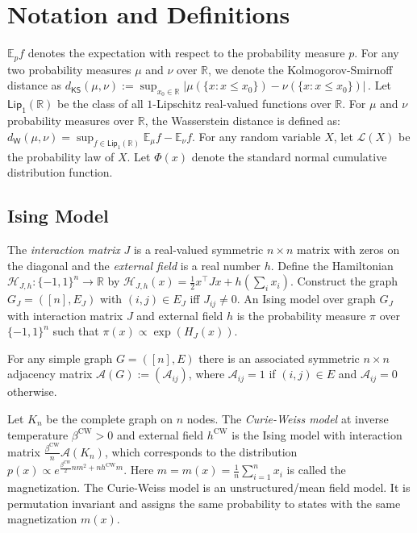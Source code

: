 \documentclass[final,12pt]{colt2018}
\begin{document}
\section{Notation and Definitions}\label{s:notation}
$\mathbb{E}_p f$ denotes the expectation with respect to the probability measure $p$. For any two probability measures $\mu$ and $\nu$ over $\mathbb{R}$, we denote the Kolmogorov-Smirnoff distance as $d_{\mathsf{KS}}(\mu,\nu) := \sup_{x_0 \in \mathbb{R}}|\mu(\{x:x \leq x_0\} ) - \nu(\{x: x \leq x_0\})|\,.$
Let $\mathsf{Lip}_1(\mathbb{R})$ be the class of all $1$-Lipschitz real-valued functions over $\mathbb{R}$. For $\mu$ and $\nu$ probability measures over $\mathbb{R}$, the Wasserstein distance is defined as:
$d_{\mathsf{W}}(\mu,\nu) = \sup_{f \in \mathsf{Lip}_1(\mathbb{R})} \mathbb{E}_{\mu}f -\mathbb{E}_{\nu}f$.
For any random variable $X$, let $\mathcal{L}(X)$ be the probability law of $X$. Let $\Phi(x)$ denote the standard normal cumulative distribution function.

\subsection{Ising Model}
The \emph{interaction matrix} $J$ is a real-valued symmetric $n \times n$ matrix with zeros on the diagonal and the \emph{external field} is a real number $h$. Define the Hamiltonian $\mathcal{H}_{J,h}: \{-1,1\}^n \to \mathbb{R}$ by $\mathcal{H}_{J,h}(x) = \frac{1}{2}x^{\intercal}Jx + h\left(\sum_i x_i\right)$. Construct the graph $G_J = ([n],E_J)$ with $(i,j) \in E_J$ iff $J_{ij} \neq 0$.  An Ising model over graph $G_J$ with interaction matrix $J$ and external field $h$ is the probability measure $\pi$ over $\{-1,1\}^n$ such that $\pi(x) \propto \exp{(H_J(x))}$. 


For any simple graph $G = ([n],E)$ there is an associated symmetric $n\times n$ adjacency matrix $\mathcal{A}(G) := (\mathcal{A}_{ij})$, where
$\mathcal{A}_{ij} = 
1$ if $(i,j) \in E$ and 
$\mathcal{A}_{ij} = 0$ otherwise.

 Let $K_n$ be the complete graph on $n$ nodes.
The \emph{Curie-Weiss model} at inverse temperature $\beta^{\mathrm{CW}} > 0$ and external field $h^{\mathrm{CW}}$ is the Ising model with interaction matrix $\frac{\beta^{\mathrm{CW}}}{n}\mathcal{A}(K_n)$, which corresponds to the distribution $p(x) \propto e^{\frac{\beta^{\mathrm{CW}}}{2}nm^2 + nh^{\mathrm{CW}}m}$. Here $m = m(x) = \frac{1}{n}\sum_{i=1}^n x_i$ is called the magnetization. 
The Curie-Weiss model is an unstructured/mean field model. It is permutation invariant and assigns the same probability to states with the same magnetization $m(x)$.
\end{document}
